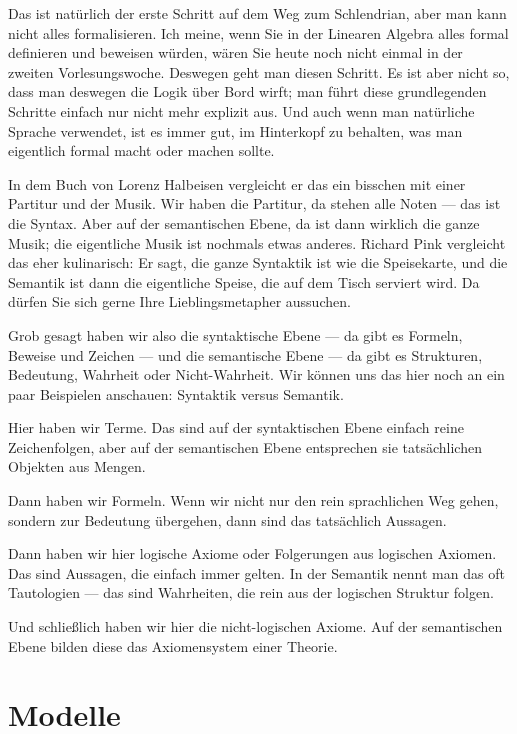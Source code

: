 \begin{spoken-clean}[00:21:23 - 00:24:28]
Das ist natürlich der erste Schritt auf dem Weg zum Schlendrian, aber man kann nicht alles formalisieren. Ich meine, wenn Sie in der Linearen Algebra alles formal definieren und beweisen würden, wären Sie heute noch nicht einmal in der zweiten Vorlesungswoche. Deswegen geht man diesen Schritt. Es ist aber nicht so, dass man deswegen die Logik über Bord wirft; man führt diese grundlegenden Schritte einfach nur nicht mehr explizit aus. Und auch wenn man natürliche Sprache verwendet, ist es immer gut, im Hinterkopf zu behalten, was man eigentlich formal macht oder machen sollte.

In dem Buch von Lorenz Halbeisen vergleicht er das ein bisschen mit einer Partitur und der Musik. Wir haben die Partitur, da stehen alle Noten --- das ist die Syntax. Aber auf der semantischen Ebene, da ist dann wirklich die ganze Musik; die eigentliche Musik ist nochmals etwas anderes. Richard Pink vergleicht das eher kulinarisch: Er sagt, die ganze Syntaktik ist wie die Speisekarte, und die Semantik ist dann die eigentliche Speise, die auf dem Tisch serviert wird. Da dürfen Sie sich gerne Ihre Lieblingsmetapher aussuchen.

Grob gesagt haben wir also die syntaktische Ebene --- da gibt es Formeln, Beweise und Zeichen --- und die semantische Ebene --- da gibt es Strukturen, Bedeutung, Wahrheit oder Nicht-Wahrheit. Wir können uns das hier noch an ein paar Beispielen anschauen: Syntaktik versus Semantik. 

Hier haben wir Terme. Das sind auf der syntaktischen Ebene einfach reine Zeichenfolgen, aber auf der semantischen Ebene entsprechen sie tatsächlichen Objekten aus Mengen. 

Dann haben wir Formeln. Wenn wir nicht nur den rein sprachlichen Weg gehen, sondern zur Bedeutung übergehen, dann sind das tatsächlich Aussagen.

Dann haben wir hier logische Axiome oder Folgerungen aus logischen Axiomen. Das sind Aussagen, die einfach immer gelten. In der Semantik nennt man das oft Tautologien --- das sind Wahrheiten, die rein aus der logischen Struktur folgen. 

Und schließlich haben wir hier die nicht-logischen Axiome. Auf der semantischen Ebene bilden diese das Axiomensystem einer Theorie.
\end{spoken-clean}

\section{Modelle}
